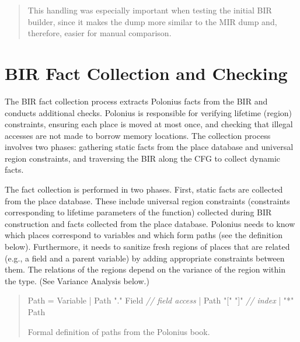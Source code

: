 \documentclass[
  11pt,
  twoside,symmetric]{report}
\newenvironment{Shaded}{}{}
\newcommand{\CommentTok}[1]{\textit{#1}}
\newcommand{\NormalTok}[1]{#1}
\newcommand{\OperatorTok}[1]{#1}
\newcommand{\StringTok}[1]{#1}
\begin{document}
\begin{quote}
This handling was especially important when testing the initial BIR
builder, since it makes the dump more similar to the MIR dump and,
therefore, easier for manual comparison.
\end{quote}

\section{BIR Fact Collection and
Checking}\label{sec:bir-fact-collection-and-checking}

The BIR fact collection process extracts Polonius facts from the BIR and
conducts additional checks. Polonius is responsible for verifying
lifetime (region) constraints, ensuring each place is moved at most
once, and checking that illegal accesses are not made to borrow memory
locations. The collection process involves two phases: gathering static
facts from the place database and universal region constraints, and
traversing the BIR along the CFG to collect dynamic facts.

The fact collection is performed in two phases. First, static facts are
collected from the place database. These include universal region
constraints (constraints corresponding to lifetime parameters of the
function) collected during BIR construction and facts collected from the
place database. Polonius needs to know which places correspond to
variables and which form paths (see the definition below). Furthermore,
it needs to sanitize fresh regions of places that are related (e.g., a
field and a parent variable) by adding appropriate constraints between
them. The relations of the regions depend on the variance of the region
within the type. (See Variance Analysis below.)

\begin{quote}
\begin{Shaded}
\begin{Highlighting}[]
\NormalTok{Path }\OperatorTok{=}\NormalTok{ Variable}
     \OperatorTok{|}\NormalTok{ Path }\StringTok{"."}\NormalTok{ Field }\CommentTok{// field access}
     \OperatorTok{|}\NormalTok{ Path }\StringTok{"["} \StringTok{"]"}   \CommentTok{// index}
     \OperatorTok{|} \StringTok{"*"}\NormalTok{ Path}
\end{Highlighting}
\end{Shaded}

Formal definition of paths from the Polonius
book.
\end{quote}
\end{document}
